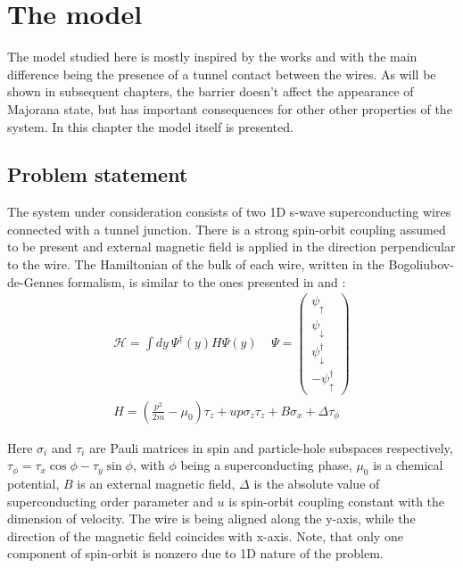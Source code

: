 \newcommand{\xbr}{\left(x\right)}
\newcommand{\br}[1]{\left(#1\right)}
\newcommand{\abs}[1]{\left|#1\right|}
\newcommand{\pdy}{\partial_y}
\newcommand{\pd}[1]{\partial_{#1}}
\newcommand{\brf}[1]{\left\{#1\right\}}

\chapter{The model}
\label{chap:model}

The model studied here is mostly inspired by the works \cite{Oreg_2010} and \cite{Lutchyn_2010} with the main difference being the presence of a tunnel contact between the wires. As will be shown in subsequent chapters, the barrier doesn't affect the appearance of Majorana state, but has important consequences for other other properties of the system. In this chapter the model itself is presented.

\section{Problem statement}

The system under consideration consists of two 1D s-wave superconducting wires connected with a tunnel junction. There is a strong spin-orbit coupling assumed to be present and external magnetic field is applied in the direction perpendicular to the wire. The Hamiltonian of the bulk of each wire, written in the Bogoliubov-de-Gennes formalism, is similar to the ones presented in \cite{Oreg_2010} and \cite{Lutchyn_2010}:
\begin{gather}
	\mathcal{H}
	=
	\int dy ~
	\Psi^\dagger
	\br{y}
	H
	\Psi
	\br{y}
	\
	~~~~
	\Psi
	=
	\begin{pmatrix}
		\psi_\uparrow
		\\
		\psi_\downarrow
		\\
		\psi_\downarrow^\dagger
		\\
		-\psi_\uparrow^\dagger
	\end{pmatrix}
	\\
	\label{bulk_Hamiltonian}
	H
	=
	\br{
		\frac{p^2}{2m}
		-\mu_0
	}\tau_z
	+
	u p \sigma_z \tau_z
	+
	B\sigma_x	
	+
	\Delta\tau_\phi
\end{gather}

Here $ \sigma_i $ and $ \tau_i $ are Pauli matrices in spin and particle-hole subspaces respectively, $ \tau_\phi = \tau_x \cos\phi - \tau_y \sin\phi$, with $ \phi $ being a superconducting phase, $ \mu_0 $ is a chemical potential, $ B $ is an external magnetic field, $ \Delta $ is the absolute value of superconducting order parameter and $ u $ is spin-orbit coupling constant with the dimension of velocity. The wire is being aligned along the y-axis, while the direction of the magnetic field coincides with x-axis. Note, that only one component of spin-orbit is nonzero due to 1D nature of the problem.

